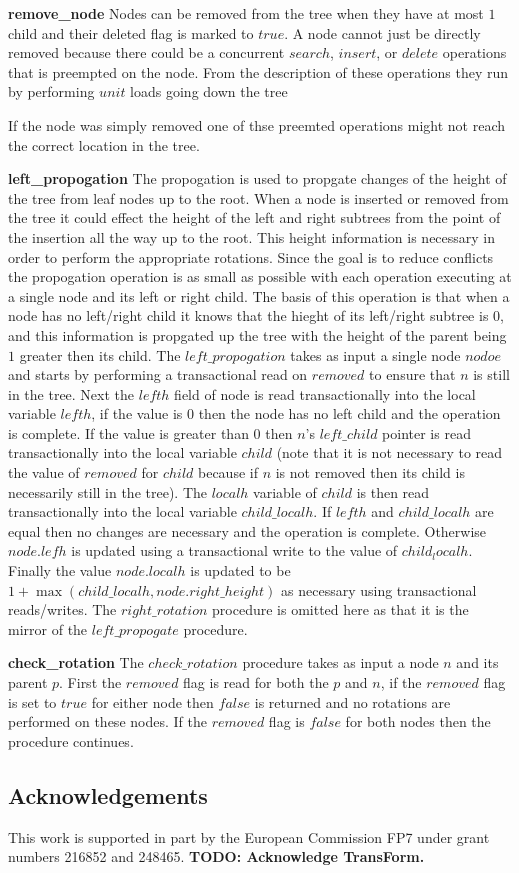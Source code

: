 \documentclass[10pt]{sigplanconf}
\begin{document}
{\bf remove\_node} Nodes can be removed from the tree when they have at most $1$ child and their deleted flag is marked to $true$.
A node cannot just be directly removed because there could be a concurrent $search$, $insert$, or $delete$ operations that is preempted on the node.
From the description of these operations they run by performing $unit$ loads going down the tree 


If the node was simply removed one of thse preemted operations might not reach the correct location in the tree. 

{\bf left\_propogation} The propogation is used to propgate changes of the height of the tree from leaf nodes up to the root.
When a node is inserted or removed from the tree it could effect the height of the left and right subtrees from the point of the insertion all the way up to the root.
This height information is necessary in order to perform the appropriate rotations.
Since the goal is to reduce conflicts the propogation operation is as small as possible with each operation executing at a single node and its left or right child.
The basis of this operation is that when a node has no left/right child it knows that the hieght of its left/right subtree is $0$, and this information is propgated up the tree with the height of the parent being $1$ greater then its child.
The $left\_propogation$ takes as input a single node $nodoe$ and starts by performing a transactional read on $removed$ to ensure that $n$ is still in the tree.
Next the $lefth$ field of node is read transactionally into the local variable $lefth$, if the value is $0$ then the node has no left child and the operation is complete.
If the value is greater than $0$ then $n$'s $left\_child$ pointer is read transactionally into the local variable $child$ (note that it is not necessary to read the value of $removed$ for $child$ because if $n$ is not removed then its child is necessarily still in the tree).
The $localh$ variable of $child$ is then read transactionally into the local variable $child\_localh$.
If $lefth$ and $child\_localh$ are equal then no changes are necessary and the operation is complete.
Otherwise $node.lefh$ is updated using a transactional write to the value of $child_localh$.
Finally the value $node.localh$ is updated to be $1 + \max(child\_localh, node.right\_height)$ as necessary using transactional reads/writes.
The $right\_rotation$ procedure is omitted here as that it is the mirror of the $left\_propogate$ procedure.

{\bf check\_rotation} The $check\_rotation$ procedure takes as input a node $n$ and its parent $p$.
First the $removed$ flag is read for both the $p$ and $n$, if the $removed$ flag is set to $true$ for either node then $false$ is returned and no rotations are performed on these nodes.
If the $removed$ flag is $false$ for both nodes then the procedure continues.


\subsection*{Acknowledgements}
This work is supported in part by the European Commission FP7 under grant numbers 216852 and 248465.
{\bf TODO: Acknowledge TransForm.}




\end{document}

